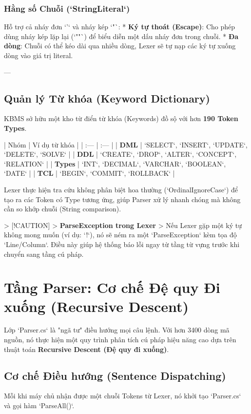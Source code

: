 \subsubsection{Hằng số Chuỗi (`StringLiteral`)}
Hỗ trợ cả nháy đơn `'` và nháy kép `"`:
*   \textbf{Ký tự thoát (Escape)}: Cho phép dùng nháy kép lặp lại (`""`) để biểu diễn một dấu nháy đơn trong chuỗi.
*   \textbf{Đa dòng}: Chuỗi có thể kéo dài qua nhiều dòng, Lexer sẽ tự nạp các ký tự xuống dòng vào giá trị literal.

---

\subsection{Quản lý Từ khóa (Keyword Dictionary)}

KBMS sở hữu một kho từ điển từ khóa (Keywords) đồ sộ với hơn \textbf{190 Token Types}.

| Nhóm | Ví dụ từ khóa |
| :--- | :--- |
| \textbf{DML} | `SELECT`, `INSERT`, `UPDATE`, `DELETE`, `SOLVE` |
| \textbf{DDL} | `CREATE`, `DROP`, `ALTER`, `CONCEPT`, `RELATION` |
| \textbf{Types} | `INT`, `DECIMAL`, `VARCHAR`, `BOOLEAN`, `DATE` |
| \textbf{TCL} | `BEGIN`, `COMMIT`, `ROLLBACK` |

Lexer thực hiện tra cứu không phân biệt hoa thường (`OrdinalIgnoreCase`) để tạo ra các Token có Type tương ứng, giúp Parser xử lý nhanh chóng mà không cần so khớp chuỗi (String comparison).

> [!CAUTION]
> \textbf{ParseException trong Lexer}
> Nếu Lexer gặp một ký tự không mong muốn (ví dụ: `!`), nó sẽ ném ra một `ParseException` kèm tọa độ `Line/Column`. Điều này giúp hệ thống báo lỗi ngay từ tầng từ vựng trước khi chuyển sang tầng cú pháp. 🚨

\section{Tầng Parser: Cơ chế Đệ quy Đi xuống (Recursive Descent)}

Lớp `Parser.cs` là "ngã tư" điều hướng mọi câu lệnh. Với hơn 3400 dòng mã nguồn, nó thực hiện một quy trình phân tích cú pháp hiệu năng cao dựa trên thuật toán \textbf{Recursive Descent (Đệ quy đi xuống)}.

\subsection{Cơ chế Điều hướng (Sentence Dispatching)}

Mỗi khi máy chủ nhận được một chuỗi Tokens từ Lexer, nó khởi tạo `Parser.cs` và gọi hàm `ParseAll()`.

